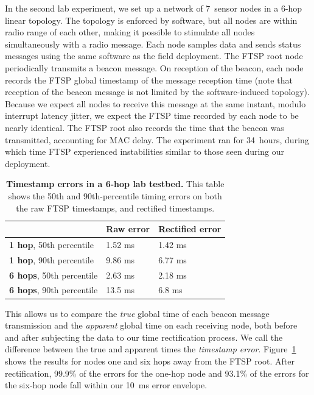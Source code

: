 In the second lab experiment, we set up a network of 7~sensor nodes in a
6-hop linear topology. The topology is enforced by software, but all nodes
are within radio range of each other, making it possible to stimulate all
nodes simultaneously with a radio message. Each node samples data and sends
status messages using the same software as the field deployment. The FTSP
root node periodically transmits a beacon message. On reception of the
beacon, each node records the FTSP global timestamp of the message reception
time (note that reception of the beacon message is not limited by the
software-induced topology). Because we expect all nodes to receive this
message at the same instant, modulo interrupt latency jitter, we expect the
FTSP time recorded by each node to be nearly identical. The FTSP root also
records the time that the beacon was transmitted, accounting for MAC delay.
The experiment ran for 34~hours, during which time FTSP experienced
instabilities similar to those seen during our deployment.

\begin{table}[t]
\begin{center}
\begin{tabular}{|lll|} \hline & \textbf{Raw error} & \textbf{Rectified error} \\ \hline
\textbf{1 hop}, 50th percentile & 1.52 ms & 1.42 ms \\
\textbf{1 hop}, 90th percentile & 9.86 ms & 6.77 ms \\ \hline
\textbf{6 hops}, 50th percentile & 2.63 ms & 2.18 ms \\
\textbf{6 hops}, 90th percentile & 13.5 ms & 6.8 ms \\ \hline
\end{tabular}
\end{center}

\caption{\textbf{Timestamp errors in a 6-hop lab testbed.} This table shows
the 50th and 90th-percentile timing errors on both the raw FTSP timestamps,
and rectified timestamps.}

\label{evaluation-fig-time-rect-lab}
\end{table}

This allows us to compare the \textit{true} global time of each beacon
message transmission and the \textit{apparent} global time on each receiving
node, both before and after subjecting the data to our time rectification
process. We call the difference between the true and apparent times the
\textit{timestamp error}. Figure~\ref{evaluation-fig-time-rect-lab} shows the
results for nodes one and six hops away from the FTSP root. After
rectification, 99.9\% of the errors for the one-hop node and 93.1\% of the
errors for the six-hop node fall within our 10~ms error envelope.

